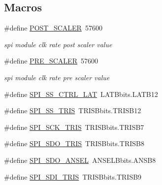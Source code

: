 \subsection*{Macros}
\begin{DoxyCompactItemize}
\item 
\#define \hyperlink{a00011_a5df9b14c775d6e4eab17c79a729a4dbf}{P\+O\+S\+T\+\_\+\+S\+C\+A\+L\+E\+R}~57600
\begin{DoxyCompactList}\small\item\em spi module clk rate post scaler value \end{DoxyCompactList}\item 
\#define \hyperlink{a00011_a5c1fd7fa207a92f0b4b78d39bbd2f34b}{P\+R\+E\+\_\+\+S\+C\+A\+L\+E\+R}~57600
\begin{DoxyCompactList}\small\item\em spi module clk rate pre scaler value \end{DoxyCompactList}\item 
\#define \hyperlink{a00011_aa8b53e04161d178ebd9c01edf1584039}{S\+P\+I\+\_\+\+S\+S\+\_\+\+C\+T\+R\+L\+\_\+\+L\+A\+T}~L\+A\+T\+Bbits.\+L\+A\+T\+B12
\item 
\#define \hyperlink{a00011_a1424f86a2482cfbcf68f709ce542e262}{S\+P\+I\+\_\+\+S\+S\+\_\+\+T\+R\+I\+S}~T\+R\+I\+S\+Bbits.\+T\+R\+I\+S\+B12
\item 
\#define \hyperlink{a00011_a98c4bd0ee0f76eb205e874355bf9cd33}{S\+P\+I\+\_\+\+S\+C\+K\+\_\+\+T\+R\+I\+S}~T\+R\+I\+S\+Bbits.\+T\+R\+I\+S\+B7
\item 
\#define \hyperlink{a00011_aa171067a2f57d1555ab4449c78847c72}{S\+P\+I\+\_\+\+S\+D\+O\+\_\+\+T\+R\+I\+S}~T\+R\+I\+S\+Bbits.\+T\+R\+I\+S\+B8
\item 
\#define \hyperlink{a00011_a11571727bdbc21b0bfb7c701599e759b}{S\+P\+I\+\_\+\+S\+D\+O\+\_\+\+A\+N\+S\+E\+L}~A\+N\+S\+E\+L\+Bbits.\+A\+N\+S\+B8
\item 
\#define \hyperlink{a00011_a40c85fd42ffb12b326b7cb9ee48f2ffb}{S\+P\+I\+\_\+\+S\+D\+I\+\_\+\+T\+R\+I\+S}~T\+R\+I\+S\+Bbits.\+T\+R\+I\+S\+B9
\end{DoxyCompactItemize}
